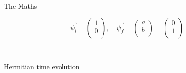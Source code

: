\documentclass[10pt]{beamer}
\begin{document}
\begin{frame}{The Maths}
\begin{scriptsize}
\begin{equation*}
    \vec{\psi_{i}}  = \begin{pmatrix}
                        1 \\
                        0 \\                
    \end{pmatrix}, \quad
    \vec{\psi_{f}}  = \begin{pmatrix}
                        a \\
                        b \\                
    \end{pmatrix}
    = \begin{pmatrix}
                        0 \\
                        1 \\                
    \end{pmatrix}
    \end{equation*}\\
    \end{scriptsize}
    \vspace{0.3cm}

    \begin{columns}
    \begin{column}{0.5\textwidth}
    \textcolor{myNewColorA}{Hermitian} time evolution\\


\end{column}
\end{columns}
\end{frame}
\end{document}
